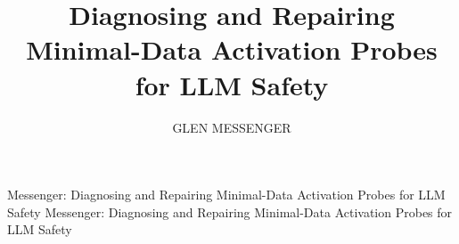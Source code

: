 \documentclass{ieeeaccess}
\begin{document}

\title{Diagnosing and Repairing Minimal-Data Activation Probes for LLM Safety}

\author{\uppercase{Glen Messenger}}
\address[1]{Independent Researcher, Sunnyvale, CA, USA (e-mail: glen.messenger@gmail.com)}

\markboth%
{Messenger: Diagnosing and Repairing Minimal-Data Activation Probes for LLM Safety}%
{Messenger: Diagnosing and Repairing Minimal-Data Activation Probes for LLM Safety}

\end{document}
